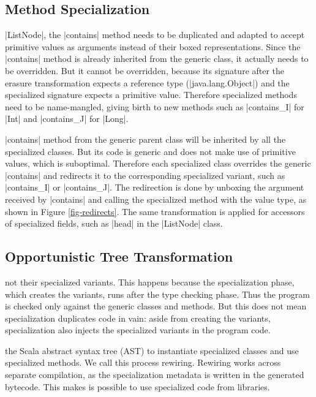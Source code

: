 \subsection{Method Specialization}
\label{subsec-spec-method}
  
 |ListNode|, the |contains| method needs to be duplicated and adapted to accept primitive values as arguments instead of their boxed representations. Since the |contains| method is already inherited from the generic class, it actually needs to be overridden. But it cannot be overridden, because its signature after the erasure \cite{java-erasure} transformation expects a reference type (|java.lang.Object|) and the specialized signature expects a primitive value. Therefore specialized methods need to be name-mangled, giving birth to new methods such as |contains_I| for |Int| and |contains_J| for |Long|. 

 |contains| method from the generic parent class will be inherited by all the specialized classes. But its code is generic and does not make use of primitive values, which is suboptimal. Therefore each specialized class overrides the generic |contains| and redirects it to the corresponding specialized variant, such as |contains_I| or |contains_J|. The redirection is done by unboxing the argument received by |contains| and calling the specialized method with the value type, as shown in Figure \ref{fig-redirects}. The same transformation is applied for accessors of specialized fields, such as |head| in the |ListNode| class. 

\subsection{Opportunistic Tree Transformation}
\label{subsec-spec-rewiring}

 not their specialized variants. This happens because the specialization phase, which creates the variants, runs after the type checking phase. Thus the program is checked only against the generic classes and methods. But this does not mean specialization duplicates code in vain: aside from creating the variants, specialization also injects the specialized variants in the program code.

 the Scala abstract syntax tree (AST) to instantiate specialized classes and use specialized methods. We call this process rewiring. Rewiring works across separate compilation, as the specialization metadata is written in the generated bytecode. This makes is possible to use specialized code from libraries. 

